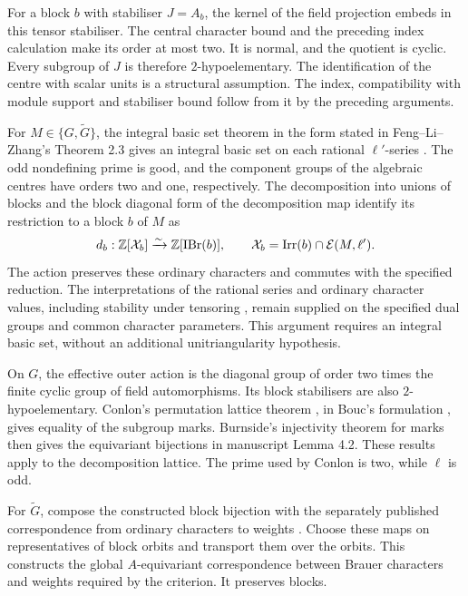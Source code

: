 For a block $b$ with stabiliser $J=A_b$, the kernel of the field projection
embeds in this tensor stabiliser. The central character bound and
the preceding index calculation make its order at most two. It is
normal, and the quotient is cyclic. Every subgroup of $J$ is
therefore $2$-hypoelementary. The identification of the centre with
scalar units is a structural assumption. The index, compatibility with
module support and stabiliser bound follow from it by the preceding
arguments.

For $M\in\{G,\widetilde G\}$, the integral basic set theorem in the
form stated in Feng--Li--Zhang's Theorem 2.3 gives an integral basic set
on each rational $\ell'$-series
\cite{FengLiZhang2022TypeB}. The odd nondefining prime is good,
and the component groups of the algebraic centres have orders two and
one, respectively. The decomposition into unions of blocks and the block diagonal form
of the decomposition map identify its restriction to a block $b$ of $M$ as
\[
 d_b:\mathbb Z[\mathcal X_b]\xrightarrow{\sim}\mathbb Z[\operatorname{IBr}(b)],
 \qquad \mathcal X_b=\operatorname{Irr}(b)\cap\mathcal E(M,\ell').
\]
The action preserves these ordinary characters and commutes with
the specified reduction. The interpretations of the rational series and
ordinary character values, including stability under tensoring
\cite[Theorem~4.7.1(3)]{GeckMalle2020}, remain supplied on the
specified dual groups and common character parameters. This argument
requires an integral basic set, without an additional unitriangularity
hypothesis.

On $G$, the effective outer action is the diagonal group of order
two times the finite cyclic group of field automorphisms. Its block stabilisers are
also $2$-hypoelementary. Conlon's permutation lattice theorem
\cite{Conlon1968}, in Bouc's formulation
\cite[Theorem~3.5.5]{Bouc2000}, gives equality of the subgroup marks.
Burnside's injectivity theorem for marks \cite[Theorem~2.3.2]{Bouc2000} then gives the equivariant
bijections in manuscript Lemma 4.2. These results apply to the
decomposition lattice. The prime used by Conlon is two, while
$\ell$ is odd.

For $\widetilde G$, compose the constructed block bijection with
the separately published correspondence from ordinary characters to weights
\cite[Proposition~7.2]{FengLiZhang2022TypeB}. Choose these maps on
representatives of block orbits and transport them over the orbits.
This constructs the global $A$-equivariant correspondence between Brauer
characters and weights required by the criterion. It preserves blocks.


